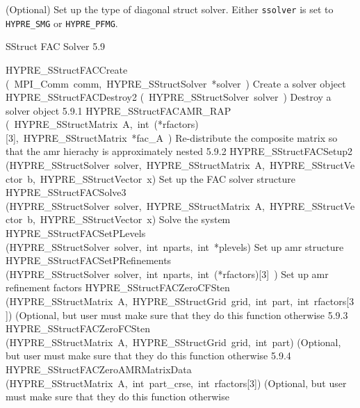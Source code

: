 \documentclass{article}
\begin{document}
\begin{cxxentry}
\begin{cxxentry}
\begin{cxxfunction}
\begin{cxxdoc}
(Optional) Set up the type of diagonal struct solver.  Either {\tt ssolver} is
set to {\tt HYPRE\_SMG} or {\tt HYPRE\_PFMG}.
\end{cxxdoc}
\end{cxxfunction}
\end{cxxentry}
\begin{cxxentry}
{}
        {SStruct FAC Solver}
        {}
        {
}
        {5.9}
\begin{cxxnames}
        {HYPRE\_SStructFACCreate}
        {(\ MPI\_Comm\ comm,\ HYPRE\_SStructSolver\ *solver\ )}
        {
Create a solver object}
        {}
\label{cxx.5.9.11}
        {HYPRE\_SStructFACDestroy2}
        {(\ HYPRE\_SStructSolver\ solver\ )}
        {
Destroy a solver object}
        {5.9.1}
        {HYPRE\_SStructFACAMR\_RAP}
        {(\ HYPRE\_SStructMatrix\ A,\ int\ (*rfactors)[3],\ HYPRE\_SStructMatrix\ *fac\_A\ )}
        {
Re-distribute the composite matrix so that the amr hierachy is approximately
nested}
        {5.9.2}
        {HYPRE\_SStructFACSetup2}
        {(HYPRE\_SStructSolver\ solver,\ HYPRE\_SStructMatrix\ A,\ HYPRE\_SStructVector\ b,\ HYPRE\_SStructVector\ x)}
        {
Set up the FAC solver structure }
        {}
\label{cxx.5.9.12}
        {HYPRE\_SStructFACSolve3}
        {(HYPRE\_SStructSolver\ solver,\ HYPRE\_SStructMatrix\ A,\ HYPRE\_SStructVector\ b,\ HYPRE\_SStructVector\ x)}
        {
Solve the system}
        {}
\label{cxx.5.9.13}
        {HYPRE\_SStructFACSetPLevels}
        {(HYPRE\_SStructSolver\ solver,\ int\ nparts,\ int\ *plevels)}
        {
Set up amr structure}
        {}
\label{cxx.5.9.14}
        {HYPRE\_SStructFACSetPRefinements}
        {(HYPRE\_SStructSolver\ solver,\ int\ nparts,\ int\ (*rfactors)[3]\ )}
        {
Set up amr refinement factors}
        {}
\label{cxx.5.9.15}
        {HYPRE\_SStructFACZeroCFSten}
        {(HYPRE\_SStructMatrix\ A,\ HYPRE\_SStructGrid\ grid,\ int\ part,\ int\ rfactors[3])}
        {
(Optional, but user must make sure that they do this function otherwise}
        {5.9.3}
        {HYPRE\_SStructFACZeroFCSten}
        {(HYPRE\_SStructMatrix\ A,\ HYPRE\_SStructGrid\ grid,\ int\ part)}
        {
(Optional, but user must make sure that they do this function otherwise}
        {5.9.4}
        {HYPRE\_SStructFACZeroAMRMatrixData}
        {(HYPRE\_SStructMatrix\ A,\ int\ part\_crse,\ int\ rfactors[3])}
        {
(Optional, but user must make sure that they do this function otherwise}

\end{cxxnames}
\end{cxxentry}
\end{cxxentry}
\end{document}
